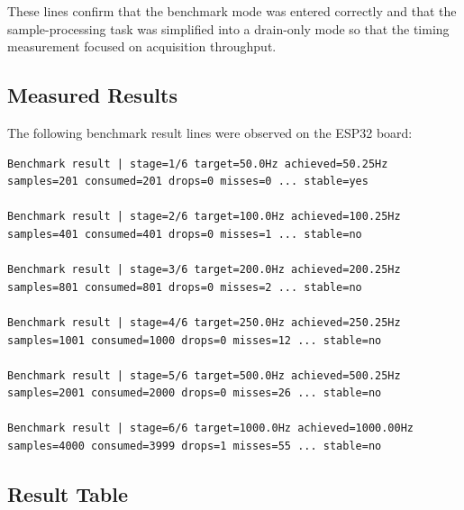 \documentclass[12pt,a4paper]{article}
\begin{document}
These lines confirm that the benchmark mode was entered correctly and that the
sample-processing task was simplified into a drain-only mode so that the timing
measurement focused on acquisition throughput.

\subsection{Measured Results}

The following benchmark result lines were observed on the ESP32 board:

\begin{lstlisting}
Benchmark result | stage=1/6 target=50.0Hz achieved=50.25Hz
samples=201 consumed=201 drops=0 misses=0 ... stable=yes

Benchmark result | stage=2/6 target=100.0Hz achieved=100.25Hz
samples=401 consumed=401 drops=0 misses=1 ... stable=no

Benchmark result | stage=3/6 target=200.0Hz achieved=200.25Hz
samples=801 consumed=801 drops=0 misses=2 ... stable=no

Benchmark result | stage=4/6 target=250.0Hz achieved=250.25Hz
samples=1001 consumed=1000 drops=0 misses=12 ... stable=no

Benchmark result | stage=5/6 target=500.0Hz achieved=500.25Hz
samples=2001 consumed=2000 drops=0 misses=26 ... stable=no

Benchmark result | stage=6/6 target=1000.0Hz achieved=1000.00Hz
samples=4000 consumed=3999 drops=1 misses=55 ... stable=no
\end{lstlisting}

\subsection{Result Table}
\end{document}
